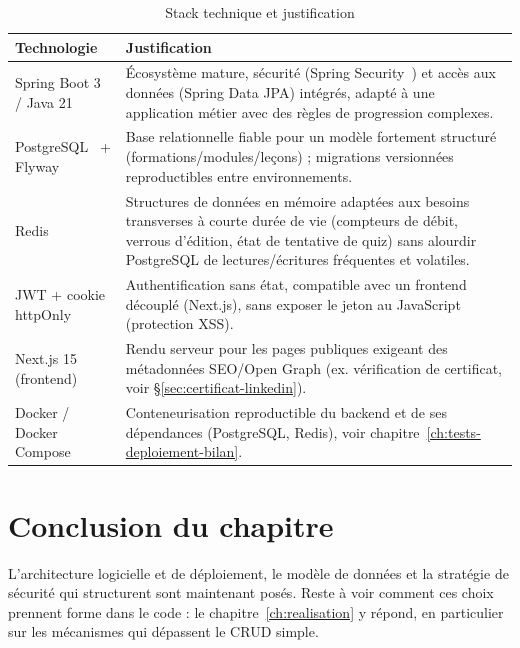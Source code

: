 \begin{table}[H]
  \centering
  \caption{Stack technique et justification}
  \label{tab:stack}
  \begin{tabular}{|p{3.2cm}|p{9cm}|}
    \toprule
    Technologie & Justification \\
    \midrule
    Spring Boot 3 / Java 21~\cite{springboot-docs} & Écosystème mature,
      sécurité (Spring Security~\cite{spring-security-docs}) et accès aux
      données (Spring Data JPA) intégrés, adapté à une application métier
      avec des règles de progression complexes. \\ \hline
    PostgreSQL~\cite{postgresql-docs} + Flyway~\cite{flyway-docs} & Base
      relationnelle fiable pour un modèle fortement structuré
      (formations/modules/leçons) ; migrations versionnées reproductibles
      entre environnements. \\ \hline
    Redis~\cite{redis-docs} & Structures de données en mémoire adaptées
      aux besoins transverses à courte durée de vie (compteurs de débit,
      verrous d'édition, état de tentative de quiz) sans alourdir
      PostgreSQL de lectures/écritures fréquentes et volatiles. \\ \hline
    JWT + cookie httpOnly & Authentification sans état, compatible avec un
      frontend découplé (Next.js), sans exposer le jeton au JavaScript
      (protection XSS). \\ \hline
    Next.js 15~\cite{nextjs-docs} (frontend) & Rendu serveur pour les
      pages publiques exigeant des métadonnées SEO/Open Graph (ex.
      vérification de certificat, voir \S\ref{sec:certificat-linkedin}). \\ \hline
    Docker / Docker Compose~\cite{docker-docs} & Conteneurisation
      reproductible du backend et de ses dépendances (PostgreSQL, Redis),
      voir chapitre~\ref{ch:tests-deploiement-bilan}. \\
    \bottomrule
  \end{tabular}
\end{table}

\section*{Conclusion du chapitre}
L'architecture logicielle et de déploiement, le modèle de données et la
stratégie de sécurité qui structurent \Entreprise{} sont maintenant
posés. Reste à voir comment ces choix prennent forme dans le code : le
chapitre~\ref{ch:realisation} y répond, en particulier sur les
mécanismes qui dépassent le CRUD simple.
